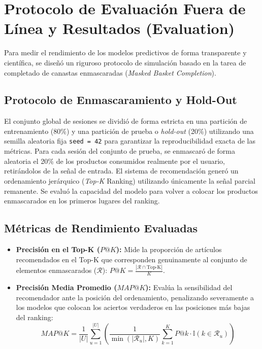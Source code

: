 \documentclass[11pt,a4paper]{article}
\begin{document}
\section{Protocolo de Evaluación Fuera de Línea y Resultados (Evaluation)}
Para medir el rendimiento de los modelos predictivos de forma transparente y científica, se diseñó un riguroso protocolo de simulación basado en la tarea de completado de canastas enmascaradas (\textit{Masked Basket Completion}).

\subsection{Protocolo de Enmascaramiento y Hold-Out}
El conjunto global de sesiones se dividió de forma estricta en una partición de entrenamiento (80\%) y una partición de prueba o \textit{hold-out} (20\%) utilizando una semilla aleatoria fija \texttt{seed = 42} para garantizar la reproducibilidad exacta de las métricas. Para cada sesión del conjunto de prueba, se enmascaró de forma aleatoria el 20\% de los productos consumidos realmente por el usuario, retirándolos de la señal de entrada. El sistema de recomendación generó un ordenamiento jerárquico (\textit{Top-K} Ranking) utilizando únicamente la señal parcial remanente. Se evaluó la capacidad del modelo para volver a colocar los productos enmascarados en los primeros lugares del ranking.

\subsection{Métricas de Rendimiento Evaluadas}
\begin{itemize}
    \item \textbf{Precisión en el Top-K ($P@K$):} Mide la proporción de artículos recomendados en el Top-K que corresponden genuinamente al conjunto de elementos enmascarados ($\mathcal{R}$): $P@K = \frac{|\mathcal{R} \cap \text{Top-K}|}{K}$.
    \item \textbf{Precisión Media Promedio ($MAP@K$):} Evalúa la sensibilidad del recomendador ante la posición del ordenamiento, penalizando severamente a los modelos que colocan los aciertos verdaderos en las posiciones más bajas del ranking:
    \begin{equation}
    MAP@K = \frac{1}{|U|} \sum_{u=1}^{|U|} \left( \frac{1}{\min(|\mathcal{R}_u|, K)} \sum_{k=1}^K P@k \cdot \mathbb{I}(k \in \mathcal{R}_u) \right)
    \end{equation}
\end{itemize}
\end{document}
